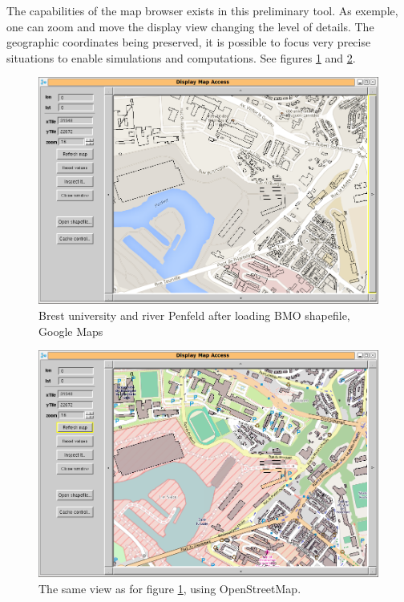 The capabilities of the map browser exists in this preliminary tool. 
As exemple, one can zoom and move the display view changing the level 
of details. The geographic coordinates being preserved, it is possible 
to focus very precise situations to enable simulations and computations. 
See figures \ref{fig:mapAccessGMap} and \ref{fig:mapAccessOSM}. 

\begin{figure}
\begin{center}
\includegraphics[width=12cm]{mapAccessPenfeldGMap.png}
\caption{Brest university and river Penfeld after loading BMO shapefile, 
Google Maps}
\label{fig:mapAccessGMap}
\end{center}
\end{figure}

\begin{figure}
\begin{center}
\includegraphics[width=12cm]{mapAccessPenfeldOSM.png}
\caption{The same view as for figure \ref{fig:mapAccessGMap}, using OpenStreetMap.}
\label{fig:mapAccessOSM}
\end{center}
\end{figure}

